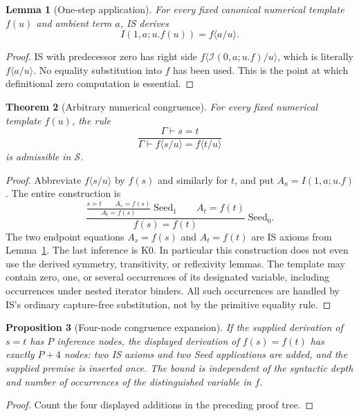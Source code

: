 \documentclass[11pt,a4paper]{article}
\newtheorem{theorem}{Theorem}[section]
\newtheorem{lemma}[theorem]{Lemma}
\newtheorem{proposition}[theorem]{Proposition}
\theoremstyle{definition}
\begin{document}
\begin{lemma}[One-step application]\label{seed:beta}
For every fixed canonical numerical template $f(u)$ and ambient term $a$,
IS derives
\[
 I(1,a;u.f(u))=f\langle a/u\rangle.
 \tag{Beta1}\label{seed:betaeq}
\]
\end{lemma}
\begin{proof}
IS with predecessor zero has right side
$f\langle\mathcal I(0,a;u.f)/u\rangle$, which is literally
$f\langle a/u\rangle$. No equality substitution into $f$ has been
used. This is the point at which definitional zero computation is essential.
\end{proof}

\begin{theorem}[Arbitrary numerical congruence]\label{seed:congruence}
For every fixed numerical template $f(u)$, the rule
\[
 \frac{\Gamma\vdash s=t}
 {\Gamma\vdash f\langle s/u\rangle=f\langle t/u\rangle}
\]
is admissible in $\mathcal S$.
\end{theorem}
\begin{proof}
Abbreviate $f\langle s/u\rangle$ by $f(s)$ and similarly for $t$,
and put $A_a=I(1,a;u.f)$.
The entire construction is
\[
 \frac{
   \displaystyle\frac{s=t\qquad A_s=f(s)}{A_t=f(s)}\;\mathrm{Seed}_1
   \qquad A_t=f(t)
 }{f(s)=f(t)}\;\mathrm{Seed}_0.
\]
The two endpoint equations $A_s=f(s)$ and $A_t=f(t)$ are IS axioms
from Lemma~\ref{seed:beta}. The last inference is K0.
In particular this construction does not even use the derived
symmetry, transitivity, or reflexivity lemmas.
The template may contain zero, one, or several occurrences of its
designated variable, including occurrences under nested iterator binders.
All such occurrences are handled by IS's ordinary capture-free
substitution, not by the primitive equality rule.
\end{proof}

\begin{proposition}[Four-node congruence expansion]\label{seed:nodes}
If the supplied derivation of $s=t$ has $P$ inference nodes, the displayed
derivation of $f(s)=f(t)$ has exactly $P+4$ nodes: two IS axioms and two
Seed applications are added, and the supplied premise is inserted once.
The bound is independent of the syntactic depth and number of occurrences
of the distinguished variable in $f$.
\end{proposition}
\begin{proof}
Count the four displayed additions in the preceding proof tree.
\end{proof}
\end{document}

